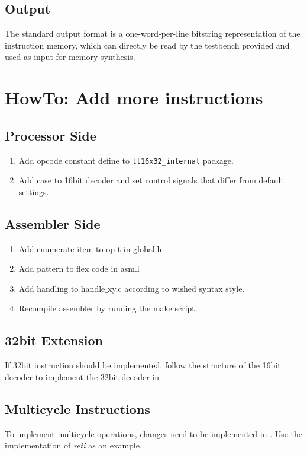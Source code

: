 \subsection{Output}
The standard output format is a one-word-per-line bitstring representation of the instruction memory, which can directly be read by the testbench provided and used as input for memory synthesis.

\section{HowTo: Add more instructions}
\subsection{Processor Side}
\begin{enumerate}
\item Add opcode constant define to \verb=lt16x32_internal= package.
\item Add case to 16bit decoder and set control signals that differ from default settings.
\end{enumerate}
\subsection{Assembler Side}
\begin{enumerate}
\item Add enumerate item to op$\_$t in global.h
\item Add pattern to flex code in asm.l
\item Add handling to handle$\_$xy.c according to wished syntax style.
\item Recompile assembler by running the make script.
\end{enumerate}
\subsection{32bit Extension}
If 32bit instruction should be implemented, follow the structure of the 16bit decoder to implement the 32bit decoder in .

\subsection{Multicycle Instructions}
To implement multicycle operations, changes need to be implemented in .
Use the implementation of \textit{reti} as an example.

